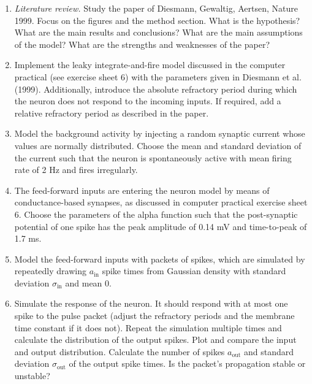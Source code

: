 \documentclass[12pt]{article}
\begin{document}
\begin{enumerate}
    \item \textit{Literature review.} Study the paper of Diesmann, Gewaltig,
        Aertsen, Nature 1999. Focus on the figures and the method
        section. What is the hypothesis? What are the main results
        and conclusions? What are the main assumptions of the model?
        What are the strengths and weaknesses of the paper?

    \item Implement the leaky integrate-and-fire model discussed in
        the computer practical (see exercise sheet 6) with the parameters given
        in Diesmann et al. (1999). Additionally, introduce the absolute
        refractory period during which the neuron does not respond to
        the incoming inputs. If required, add a relative refractory
        period as described in the paper.


    \item Model the background activity by injecting a random synaptic
        current whose values are normally distributed. Choose the mean
        and standard deviation of the current such that the neuron is
        spontaneously active with mean firing rate of 2 Hz and fires
        irregularly.

    \item The feed-forward inputs are entering the neuron model by
        means of conductance-based synapses, as discussed in computer
        practical exercise sheet 6. Choose the parameters of the alpha
        function such that the post-synaptic potential of one spike has
        the peak amplitude of 0.14 mV and time-to-peak of 1.7 ms.

    \item Model the feed-forward inputs with packets of spikes, which
        are simulated by repeatedly drawing $a_\mathrm{in}$ spike times
        from Gaussian density with standard deviation
        $\sigma_\mathrm{in}$ and mean 0.

    \item Simulate the response of the neuron. It should respond with at
        most one spike to the pulse packet (adjust the refractory
        periods and the membrane time constant if it does not). Repeat the
        simulation multiple times and calculate the distribution of
        the output spikes. Plot and compare the input and output
        distribution.  Calculate the number of spikes $a_\mathrm{out}$ and
        standard deviation $\sigma_\mathrm{out}$ of the output spike times.
        Is the packet's propagation stable or unstable?


\end{enumerate}
\end{document}

